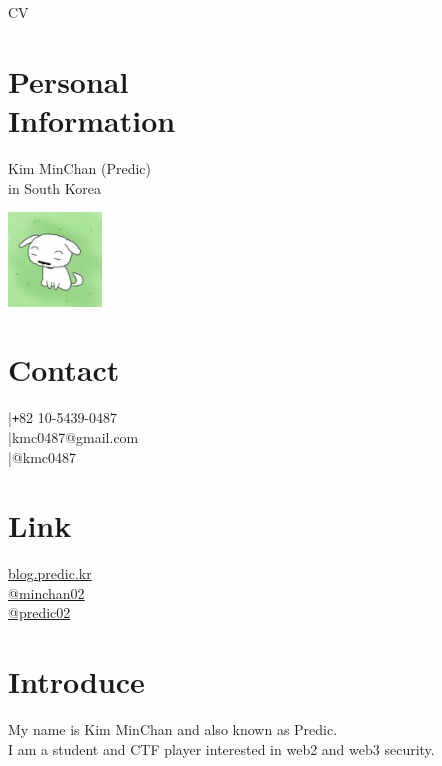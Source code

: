 \documentclass[margin,line]{resume}
\begin{document}
{\sc \Large CV}
\begin{resume}

\begin{minipage}{0.75\textwidth}
  \section{\mysidestyle Personal\\Information}
  Kim MinChan (Predic) \\
  in South Korea
\end{minipage}
\hfill
\begin{minipage}{0.2\textwidth}
  \begin{flushright}
    \includegraphics[width=2.5cm]{profile_image.jpg}
  \end{flushright}
\end{minipage}

    \section{\mysidestyle Contact}
    \faPhone  \space |\texttt{+}82 10-5439-0487 \\
    \faEnvelope  \space |kmc0487@gmail.com \\
     |@kmc0487

    \section{\mysidestyle Link}
    \faLink  \space \href{https://blog.predic.kr}{blog.predic.kr} \\ 
    \faGithub  \space \href{https://github.com/minchan02}{@minchan02} \\
    \faTwitter \space \href{https://x.com/predic02}{@predic02} 
   

    \section{\mysidestyle Introduce}
    My name is Kim MinChan and also known as Predic. \\
    I am a student and CTF player interested in web2 and web3 security.
 

\end{resume}
\end{document}
